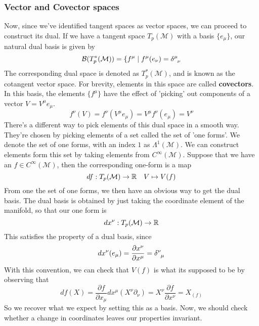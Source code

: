 \subsubsection{Vector and Covector spaces} 
Now, since we've identified tangent spaces as vector spaces, we can proceed to construct its dual. 
If we have a tangent space $ T_p ( \mathcal{ M}) $ with a basis $\{ e_\mu  \}$, our natural dual basis is 
given by 
\[
\mathcal{B }( T_p^* ( \mathcal{M})) = \{ f^\mu  \mid f^\mu  ( e_\nu  ) = \delta \indices{^\mu _\nu  } 
\] The corresponding dual space is denoted as $T_p^* ( \mathcal{ M}) $, and is known as 
the cotangent vector space. 
For brevity, elements in this space are called \textbf{ covectors}. 
In this basis, the elements $ \{ f^\mu  \}$ have the effect of 'picking' out components of a vector $ V = V^\mu e_\mu  $. 
\[
f^\nu  ( V )  =f^\nu  ( V^\mu  e_\mu  )  = V^\mu  f^\nu  ( e_\mu )  = V^\nu  
\] There's a different way to pick elements of this dual space in a smooth way. 
They're chosen by picking elements of a set called the set of 'one forms'. 
We denote the set of one forms, with an index $1 $ as $ \Lambda^{1}( \mathcal{M }) $. 
We can construct elements form this set by taking elements from $ C^\infty ( \mathcal{M} )$. 
Suppose that we have an $ f \in C^\infty ( \mathcal{ M } ) $, then the corresponding one-form is a map 
\[
df : T_p ( \mathcal{ M}) \to  \mathbb{R} \quad V \mapsto V( f) 
\] From one the set of one forms, we then have an obvious way to get the dual basis. 
The dual basis is obtained by just taking the coordinate element of the manifold, so that our one form is 
\[
dx^\nu  : T_p ( \mathcal{ M }) \to  \mathbb{R}
\] This satisfies the property of a dual basis, since 
\[
dx^\nu ( e_\mu  )  = \frac{\partial x^\nu  }{\partial x^\mu  } = \delta \indices{^\nu _\mu  } 
\] With this convention, we can check that 
$ V ( f) $ is what its supposed to be by observing that
\[
df( X)  = \frac{\partial f}{\partial x_\mu} dx^\mu ( X^\nu \partial _\nu )  = X^\nu \frac{\partial f}{\partial x^\nu} = X_ ( f)  
\]  So we recover what we expect 
by setting this as a basis. Now, we should
check whether a change in coordinates leaves our properties invariant. 


